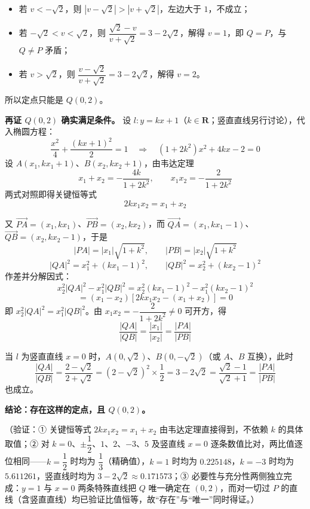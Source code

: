 \begin{answer}
\begin{itemize}
\item 若 \(v<-\sqrt2\)，则 \(|v-\sqrt2|>|v+\sqrt2|\)，左边大于 \(1\)，不成立；
\item 若 \(-\sqrt2<v<\sqrt2\)，则 \(\dfrac{\sqrt2-v}{v+\sqrt2}=3-2\sqrt2\)，解得 \(v=1\)，即 \(Q=P\)，与 \(Q\neq P\) 矛盾；
\item 若 \(v>\sqrt2\)，则 \(\dfrac{v-\sqrt2}{v+\sqrt2}=3-2\sqrt2\)，解得 \(v=2\)。
\end{itemize}

所以定点只能是 \(Q(0,2)\)。

\textbf{再证 \(Q(0,2)\) 确实满足条件。} 设 \(l:y=kx+1\)（\(k\in\mathbf R\)；竖直直线另行讨论），代入椭圆方程：
\nopagebreak[4]
\[\dfrac{x^{2}}4+\dfrac{(kx+1)^{2}}2=1\quad\Rightarrow\quad(1+2k^{2})x^{2}+4kx-2=0\]
设 \(A(x_1,kx_1+1)\)、\(B(x_2,kx_2+1)\)，由韦达定理
\nopagebreak[4]
\[x_1+x_2=-\dfrac{4k}{1+2k^{2}},\qquad x_1x_2=-\dfrac{2}{1+2k^{2}}\]
两式对照即得关键恒等式
\nopagebreak[4]
\[2kx_1x_2=x_1+x_2\]

又 \(\overrightarrow{PA}=(x_1,kx_1)\)、\(\overrightarrow{PB}=(x_2,kx_2)\)，而 \(\overrightarrow{QA}=(x_1,kx_1-1)\)、\(\overrightarrow{QB}=(x_2,kx_2-1)\)，于是
\nopagebreak[4]
\[|PA|=|x_1|\sqrt{1+k^{2}},\qquad |PB|=|x_2|\sqrt{1+k^{2}}\]
\nopagebreak[4]
\[|QA|^{2}=x_1^{2}+(kx_1-1)^{2},\qquad |QB|^{2}=x_2^{2}+(kx_2-1)^{2}\]
作差并分解因式：
\nopagebreak[4]
\[x_2^{2}|QA|^{2}-x_1^{2}|QB|^{2}=x_2^{2}(kx_1-1)^{2}-x_1^{2}(kx_2-1)^{2}\]
\nopagebreak[4]
\[=(x_1-x_2)\left[2kx_1x_2-(x_1+x_2)\right]=0\]
即 \(x_2^{2}|QA|^{2}=x_1^{2}|QB|^{2}\)。由 \(x_1x_2=-\dfrac{2}{1+2k^{2}}\neq0\) 可开方，得
\nopagebreak[4]
\[\dfrac{|QA|}{|QB|}=\dfrac{|x_1|}{|x_2|}=\dfrac{|PA|}{|PB|}\]

当 \(l\) 为竖直直线 \(x=0\) 时，\(A(0,\sqrt2)\)、\(B(0,-\sqrt2)\)（或 \(A\)、\(B\) 互换），此时
\nopagebreak[4]
\[\dfrac{|QA|}{|QB|}=\dfrac{2-\sqrt2}{2+\sqrt2}=\left(2-\sqrt2\right)^{2}\times\dfrac1{2}=3-2\sqrt2=\dfrac{\sqrt2-1}{\sqrt2+1}=\dfrac{|PA|}{|PB|}\]
也成立。

\textbf{结论：存在这样的定点，且 \(Q(0,2)\)。}

（验证：① 关键恒等式 \(2kx_1x_2=x_1+x_2\) 由韦达定理直接得到，不依赖 \(k\) 的具体取值；② 对 \(k=0\)、\(\pm\dfrac12\)、\(1\)、\(2\)、\(-3\)、\(5\) 及竖直线 \(x=0\) 逐条数值比对，两比值逐位相同——\(k=\dfrac12\) 时均为 \(\dfrac13\)（精确值），\(k=1\) 时均为 \(0.225148\)，\(k=-3\) 时均为 \(5.611261\)，竖直线时均为 \(3-2\sqrt2\approx0.171573\)；③ 必要性与充分性两侧独立完成：\(y=1\) 与 \(x=0\) 两条特殊直线把 \(Q\) 唯一确定在 \((0,2)\)，而对一切过 \(P\) 的直线（含竖直直线）均已验证比值恒等，故“存在”与“唯一”同时得证。）



\end{answer}
